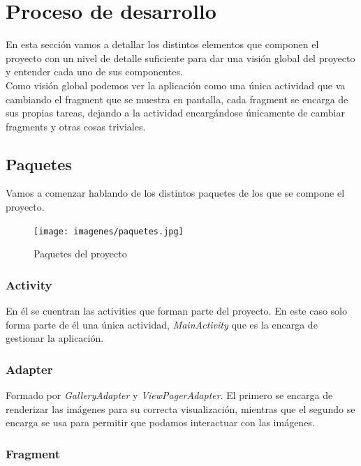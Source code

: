 \section{Proceso de desarrollo}

En esta sección vamos a detallar los distintos elementos que componen el proyecto con un nivel de detalle suficiente para dar una visión global del proyecto y entender cada uno de sus componentes.\\

Como visión global podemos ver la aplicación como una única actividad que va cambiando el fragment que se muestra en pantalla, cada fragment se encarga de sus propias tareas, dejando a la actividad encargándose únicamente de cambiar fragments y otras cosas triviales.

\subsection{Paquetes}

Vamos a comenzar hablando de los distintos paquetes de los que se compone el proyecto.

\begin{figure}[H] %
\centering
\texttt{[image: imagenes/paquetes.jpg]}  %
\label{paquetes}
\caption{Paquetes del proyecto}
\end{figure}

\subsubsection{Activity}

En él se cuentran las activities que forman parte del proyecto. En este caso solo forma parte de él una única actividad, \textit{MainActivity} que es la encarga de gestionar la aplicación.

\subsubsection{Adapter}

Formado por \textit{GalleryAdapter} y \textit{ViewPagerAdapter}. El primero se encarga de renderizar las imágenes para su correcta visualización, mientras que el segundo se encarga se usa para permitir que podamos interactuar con las imágenes.

\subsubsection{Fragment}

